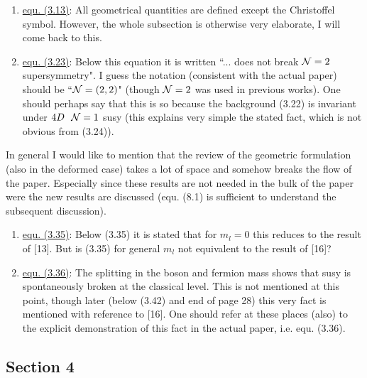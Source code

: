 \documentclass[a4paper,12pt]{article}
\begin{document}
\begin{enumerate}

\item \underline{equ. (3.13)}: All geometrical quantities are defined
except the Christoffel symbol. However, the whole subsection is
otherwise very elaborate, I will come back to this.

\item \underline{equ. (3.23)}: Below this equation it is written ``...
does not break ${\cal N}=2$ supersymmetry". I guess the notation
(consistent with the actual paper) should be ``${\cal N}=(2,2)$"
(though ${\cal N}=2$ was used in previous works). One should perhaps
say that this is so because the background (3.22) is invariant under
$4D\ \ {\cal N}=1$ susy (this explains very simple the stated fact,
which is not obvious from (3.24)).

\end{enumerate}

In general I would like to mention that the review of the geometric
formulation (also in the deformed case) takes a lot of space and
somehow breaks the flow of the paper. Especially since these results
are not needed in the bulk of the paper were the new results are
discussed (equ. (8.1) is sufficient to understand the subsequent
discussion).


\begin{enumerate}

\item \underline{equ. (3.35)}: Below (3.35) it is stated that for $m_l
=0$ this reduces to the result of [13]. But is (3.35) for general
$m_l$ not equivalent to the result of [16]?

\item \underline{equ. (3.36)}: The splitting in the boson and fermion
mass shows that susy is spontaneously broken at the classical level.
This is not mentioned at this point, though later (below (3.42) and
end of page 28) this very fact is mentioned with reference to [16].
One should refer at these places (also) to the explicit demonstration
of this fact in the actual paper, i.e. equ. (3.36).

\end{enumerate}

\subsection*{Section 4}
\end{document}
